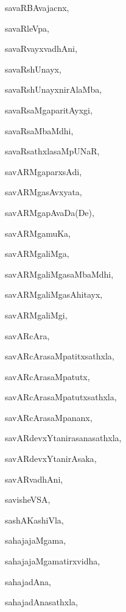 \begin{multicols}{2}
{savaRBAvajacnx}, \pageref{savaRBAvajacnx}

{savaRleVpa}, \pageref{savaRleVpa}

{savaRvayxvadhAni}, \pageref{savaRvayxvadhAni}

{savaRshUnayx}, \pageref{savaRshUnayx}

{savaRshUnayxnirAlaMba}, \pageref{savaRshUnayxnirAlaMba}

{savaRsaMgaparitAyxgi}, \pageref{savaRsaMgaparitAyxgi}

{savaRsaMbaMdhi}, \pageref{savaRsaMbaMdhi}

{savaRsathxlasaMpUNaR}, \pageref{savaRsathxlasaMpUNaR}

{savARMgaparxsAdi}, \pageref{savARMgaparxsAdi}

{savARMgasAvxyata}, \pageref{savARMgasAvxyata}

{savARMgapAvaDa(De)}, \pageref{savARMgapAvaDaDe}

{savARMgamuKa}, \pageref{savARMgamuKa}

{savARMgaliMga}, \pageref{savARMgaliMga}

{savARMgaliMgasaMbaMdhi}, \pageref{savARMgaliMgasaMbaMdhi}

{savARMgaliMgasAhitayx}, \pageref{savARMgaliMgasAhitayx}

{savARMgaliMgi}, \pageref{savARMgaliMgi}

{savARcAra}, \pageref{savARcAra}

{savARcArasaMpatitxsathxla}, \pageref{savARcArasaMpatitxsathxla}

{savARcArasaMpatutx}, \pageref{savARcArasaMpatutx}

{savARcArasaMpatutxsathxla}, \pageref{savARcArasaMpatutxsathxla}

{savARcArasaMpananx}, \pageref{savARcArasaMpananx}

{savARdevxYtanirasanasathxla}, \pageref{savARdevxYtanirasanasathxla}

{savARdevxYtanirAsaka}, \pageref{savARdevxYtanirAsaka}

{savARvadhAni}, \pageref{savARvadhAni}

{savisheVSA}, \pageref{savisheVSA}

{sashAKashiVla}, \pageref{sashAKashiVla}

{sahajajaMgama}, \pageref{sahajajaMgama}

{sahajajaMgamatirxvidha}, \pageref{sahajajaMgamatirxvidha}

{sahajadAna}, \pageref{sahajadAna}

{sahajadAnasathxla}, \pageref{sahajadAnasathxla}


\end{multicols}
